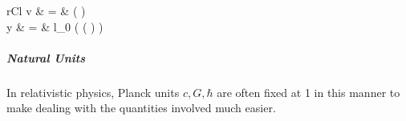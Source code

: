 \documentclass[11pt]{article}
\begin{document}
	\begin{IEEEeqnarray}{rCl}
		v & = &  \tanh \left(  \right)\\
		y & = & l_0 \ln ( \cosh \left(  \right) )
	\end{IEEEeqnarray}
	
	\subparagraph{Natural Units} In relativistic physics, Planck units $c, G, \hbar$ are often fixed at 1 in this manner to make dealing with the quantities involved much easier.
	
	
%		
%		


\end{document}

